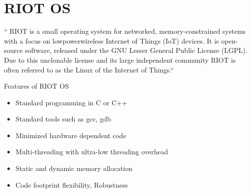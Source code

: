 \section{RIOT OS}

`` RIOT is a small operating system for networked, memory-constrained
systems with a focus on lowpowerwireless Internet of Things (IoT) devices.
It is open-source software, released under the GNU Lesser General
Public License (LGPL). Due to this unclonable license and its large
independent community RIOT is often referred to as the Linux of the
Internet of Things.``\cite{hid-sp18-522-riot}

Features of RIOT OS\:

\begin{itemize}
	\item  Standard programming in C or C++
   	\item  Standard tools such as gcc, gdb
	\item  Minimized hardware dependent code
	\item  Multi-threading with ultra-low threading overhead 
   	\item  Static and dynamic memory allocation
	\item  Code footprint flexibility, Robustness
\end{itemize}
